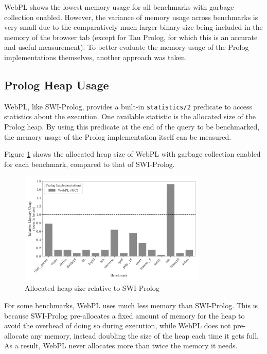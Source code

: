 WebPL shows the lowest memory usage for all benchmarks with garbage collection enabled. However, the variance of memory usage across benchmarks is very small due to the comparatively much larger binary size being included in the memory of the browser tab (except for Tau Prolog, for which this is an accurate and useful measurement). To better evaluate the memory usage of the Prolog implementations themselves, another approach was taken.

\subsection{Prolog Heap Usage}

\label{sec:prolog-heap-usage}

WebPL, like SWI-Prolog, provides a built-in \texttt{statistics/2} predicate to access statistics about the execution. One available statistic is the allocated size of the Prolog heap. By using this predicate at the end of the query to be benchmarked, the memory usage of the Prolog implementation itself can be measured.

Figure \ref{fig:heap-usage} shows the allocated heap size of WebPL with garbage collection enabled for each benchmark, compared to that of SWI-Prolog.

\begin{figure}[H]
\centering
\includegraphics[width=0.8\textwidth]{relative_memory_builtin.pdf}
\caption{Allocated heap size relative to SWI-Prolog}
\label{fig:heap-usage}
\end{figure}

For some benchmarks, WebPL uses much less memory than SWI-Prolog. This is because SWI-Prolog pre-allocates a fixed amount of memory for the heap to avoid the overhead of doing so during execution, while WebPL does not pre-allocate any memory, instead doubling the size of the heap each time it gets full. As a result, WebPL never allocates more than twice the memory it needs.

